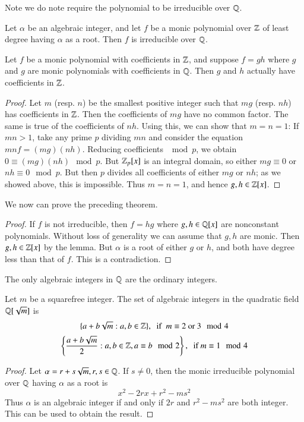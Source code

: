 Note we do note require the polynomial to be irreducible over $\mathbb Q$.

\begin{thm}
    Let $\alpha$ be an algebraic integer, and let $f$ be a monic polynomial over $\mathbb Z$ of least degree having $\alpha$ as a root. Then $f$ is irreducible over $\mathbb Q$.
\end{thm}

\begin{lem}
    Let $f$ be a monic polynomial with coefficients in $\mathbb Z$, and suppose $f = gh$ where $g$ and $g$ are monic polynomials with coefficients in $\mathbb Q$. Then $g$ and $h$ actually have coefficients in $\mathbb Z$.
\end{lem}
\begin{proof}
    Let $m$ (resp. $n$) be the smallest positive integer such that $mg$ (resp. $nh$) has coefficients in $\mathbb Z$. Then the coefficients of $mg$ have no common factor. The same is true of the coefficients of $nh$. Using this, we can show that $m=n=1$: If $mn > 1$, take any prime $p$ dividing $mn$ and consider the equation $mnf = (mg)(nh)$. Reducing coefficients $\mod p$, we obtain $0 \equiv (mg)(nh)\mod p$. But $\mathbb Z_p[x]$ is an integral domain, so either $mg \equiv 0$ or $nh \equiv 0 \mod p$. But then $p$ divides all coefficients of either $mg$ or $nh$; as we showed above, this is impossible. Thus $m = n = 1$, and hence $g,h \in \mathbb Z[x]$.
\end{proof}

We now can prove the preceding theorem.
\begin{proof}
    If $f$ is not irreducible, then $f = hg$ where $g,h \in \mathbb Q[x]$ are nonconstant polynomials. Without loss of generality we can assume that $g,h$ are monic. Then $g,h \in \mathbb Z[x]$ by the lemma. But $\alpha$ is a root of either $g$ or $h$, and both have degree less than that of $f$. This is a contradiction.
\end{proof}

\begin{cor}
    The only algebraic integers in $\mathbb Q$ are the ordinary integers.
\end{cor}

\begin{cor}
    Let $m$ be a squarefree integer. The set of algebraic integers in the quadratic field $\mathbb Q[\sqrt{m}]$ is $$\{a+b\sqrt{m}:a,b \in \mathbb Z\},\;\text{ if }\;m\equiv 2\text{ or }3\mod 4$$
    $$\left\{\frac{a+b\sqrt{m}}{2}:a,b \in \mathbb Z,a\equiv b \mod 2\right\},\;\text{ if }m\equiv 1\mod 4$$
\end{cor}
\begin{proof}
    Let $\alpha = r+s\sqrt{m}, r,s \in \mathbb Q$. If $s \neq 0$, then the monic irreducible polynomial over $\mathbb Q$ having $\alpha$ as a root is $$x^2-2rx+r^2-ms^2$$
    Thus $\alpha$ is an algebraic integer if and only if $2r$ and $r^2-ms^2$ are both integer. This can be used to obtain the result.
\end{proof}

